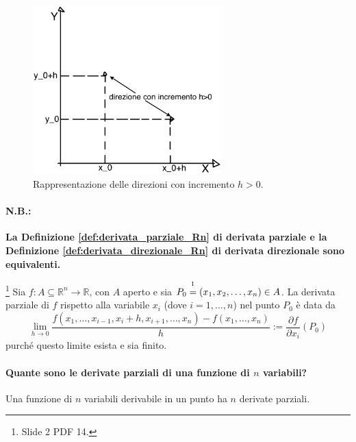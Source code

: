 \begin{figure}
    \centering
    \includegraphics[width=0.65\textwidth]{Analisi2/figures/rappresentazione_direzione_R2.jpeg}
    \caption{Rappresentazione delle direzioni con incremento $h>0$.}\label{fig:rappresentazione_direzione_R2}
\end{figure}

\paragraph{N.B.:} \textbf{La Definizione \ref{def:derivata_parziale_Rn} di derivata parziale e la Definizione \ref{def:derivata_direzionale_Rn} di derivata direzionale sono equivalenti.}

\begin{definition}\label{def:derivata_parziale_Rn}\footnote{Slide 2 PDF 14.}
    Sia $f:A\subseteq\mathbb R^n\rightarrow\mathbb R$, con $A$ aperto e sia $P_0\overset{\footnotemark}{=}(x_1,x_2,\hdots, x_n)\in A$. La derivata parziale di $f$ rispetto alla variabile $x_i$ (dove $i=1,\hdots, n$) nel punto $P_0$ è data da
    \begin{equation}\label{eq:derivata_parziale_Rn}
        \lim_{h\rightarrow 0}\frac{f(x_1,\hdots,x_{i-1},x_i+h,x_{i+1},\hdots,  x_n)-f(x_1,\hdots, x_n)}{h}:=\frac{\partial f}{\partial x_i}(P_0)
    \end{equation}
    purché questo limite esista e sia finito.
\end{definition}

\paragraph{Quante sono le derivate parziali di una funzione di $n$ variabili?} Una funzione di $n$ variabili derivabile in un punto ha $n$ derivate parziali.

